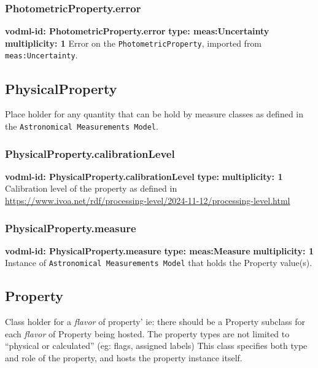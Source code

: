     \subsubsection{PhotometricProperty.error}
      \textbf{vodml-id: PhotometricProperty.error} \newline
      \textbf{type: meas:Uncertainty} \newline
      \textbf{multiplicity: 1} \newline
      Error on the \texttt{PhotometricProperty}, imported from \texttt{meas:Uncertainty}.

  \subsection{PhysicalProperty}
  \label{sect:PhysicalProperty}
    Place holder for any quantity that can be hold by measure classes as defined in the \texttt{Astronomical Measurements Model}.

    \subsubsection{PhysicalProperty.calibrationLevel}
      \textbf{vodml-id: PhysicalProperty.calibrationLevel} \newline
      \textbf{type: } \newline
      \textbf{multiplicity: 1} \newline
      Calibration level of the property as defined in \url{https://www.ivoa.net/rdf/processing-level/2024-11-12/processing-level.html}

    \subsubsection{PhysicalProperty.measure}
      \textbf{vodml-id: PhysicalProperty.measure} \newline
      \textbf{type: meas:Measure} \newline
      \textbf{multiplicity: 1} \newline
      Instance of \texttt{Astronomical Measurements Model} that holds the Property value(s).

  \subsection{Property}
  \label{sect:Property}
    Class holder for a \textit{flavor} of property’ ie: there should be a Property subclass for each \textit{flavor} of Property being hosted. The property types are not limited to “physical or calculated” (eg: flags, assigned labels) This class specifies both type and role of the property, and hosts the property instance itself.

